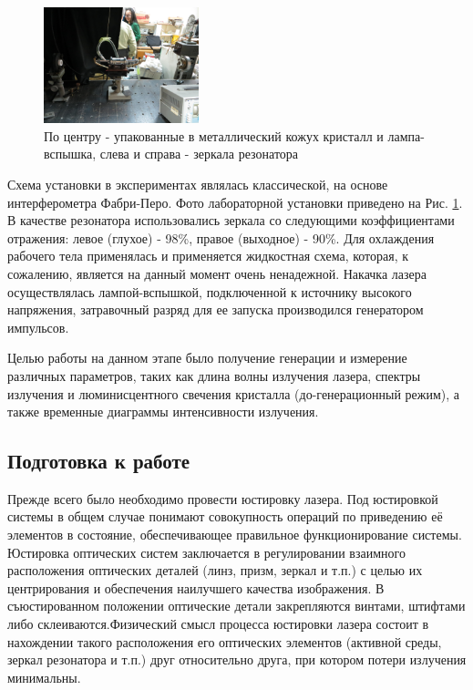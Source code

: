 \documentclass[twocolumn]{article}
\begin{document}
\begin{figure}
\centering
\includegraphics[width=0.4\textwidth]{LEMPH Report_files/apparatus.JPG}
\caption{По центру - упакованные в металлический кожух кристалл и лампа-вспышка, слева и справа - зеркала резонатора \label{fig:apparatus}}
\end{figure}

Схема установки в экспериментах являлась классической, на основе интерферометра Фабри-Перо. Фото лабораторной установки приведено на Рис. \ref{fig:apparatus}. В качестве резонатора использовались зеркала со следующими коэффициентами отражения: левое (глухое) - 98\%, правое (выходное) - 90\%. Для охлаждения рабочего тела применялась и применяется жидкостная схема, которая, к сожалению, является на данный момент очень ненадежной. Накачка лазера осуществлялась лампой-вспышкой, подключенной к источнику высокого напряжения, затравочный разряд для ее запуска производился генератором импульсов.

Целью работы на данном этапе было получение генерации и измерение различных параметров, таких как длина волны излучения лазера, спектры излучения и люминисцентного свечения кристалла (до-генерационный режим), а также временные диаграммы интенсивности излучения.

\subsection{Подготовка к работе}
Прежде всего было необходимо провести юстировку лазера. Под юстировкой системы в общем случае
понимают совокупность операций по приведению её элементов в состояние,
обеспечивающее правильное функционирование системы. Юстировка
оптических систем заключается в регулировании взаимного расположения
оптических деталей (линз, призм, зеркал и т.п.) с целью их центрирования
и обеспечения наилучшего качества изображения. В съюстированном
положении оптические детали закрепляются винтами, штифтами либо
склеиваются.Физический смысл процесса юстировки лазера
состоит в нахождении такого расположения его оптических элементов
(активной среды, зеркал резонатора и т.п.) друг относительно друга, при
котором потери излучения минимальны.
\end{document}
